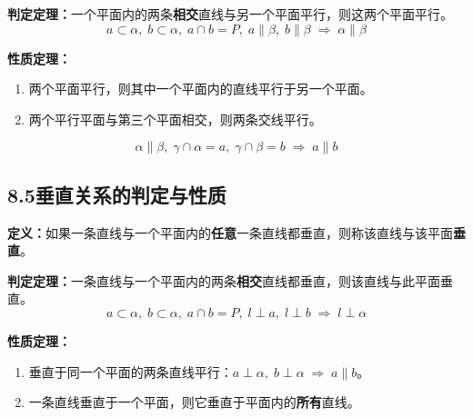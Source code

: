 \documentclass[12pt, a4paper]{ctexart}
\begin{document}
\begin{center}
\end{center}

\begin{knowledgebox}[【知识9】面面平行]
\textbf{判定定理：}一个平面内的两条\textbf{相交}直线与另一个平面平行，则这两个平面平行。
\[\boxed{a \subset \alpha,\; b \subset \alpha,\; a \cap b = P,\; a \parallel \beta,\; b \parallel \beta \;\Longrightarrow\; \alpha \parallel \beta}\]

\textbf{性质定理：}
\begin{enumerate}[leftmargin=2em]
  \item 两个平面平行，则其中一个平面内的直线平行于另一个平面。
  \item 两个平行平面与第三个平面相交，则两条交线平行。
\end{enumerate}
\[\boxed{\alpha \parallel \beta,\; \gamma \cap \alpha = a,\; \gamma \cap \beta = b \;\Longrightarrow\; a \parallel b}\]
\end{knowledgebox}

\subsection*{8.5\quad 垂直关系的判定与性质}

\begin{knowledgebox}[【知识10】线面垂直]
\textbf{定义：}如果一条直线与一个平面内的\textbf{任意}一条直线都垂直，则称该直线与该平面\textbf{垂直}。

\medskip
\textbf{判定定理：}一条直线与一个平面内的两条\textbf{相交}直线都垂直，则该直线与此平面垂直。
\[\boxed{a \subset \alpha,\; b \subset \alpha,\; a \cap b = P,\; l \perp a,\; l \perp b \;\Longrightarrow\; l \perp \alpha}\]

\textbf{性质定理：}
\begin{enumerate}[leftmargin=2em]
  \item 垂直于同一个平面的两条直线平行：$a \perp \alpha,\; b \perp \alpha \;\Longrightarrow\; a \parallel b$。
  \item 一条直线垂直于一个平面，则它垂直于平面内的\textbf{所有}直线。
\end{enumerate}
\end{knowledgebox}
\end{document}
